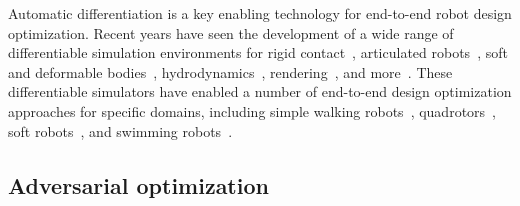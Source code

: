 Automatic differentiation is a key enabling technology for end-to-end robot design optimization. Recent years have seen the development of a wide range of differentiable simulation environments for rigid contact~\cite{heiden2021neuralsim,belubute_peres_lcp_physics,qiaoDifferentiableSimulationSoft2021,howelllecleach2022}, articulated robots~\cite{qiaoEfficientDifferentiableSimulation2021}, soft and deformable bodies~\cite{huChainQueenRealTimeDifferentiable2019,chenDaxBenchBenchmarkingDeformable2023,qiaoDifferentiableSimulationSoft2021}, hydrodynamics~\cite{ma2021diffaqua,leeAquariumFullyDifferentiable2023}, rendering~\cite{zhaoPhysicsbasedDifferentiableRendering2020,Jakob2020DrJit,lelidecDifferentiableRenderingPerturbed2021}, and more~\cite{huDiffTaichiDifferentiableProgramming2019, kidgerNeuralDifferentialEquations2022, murthyGradSimDifferentiableSimulation2021}.
%
These differentiable simulators have enabled a number of end-to-end design optimization approaches for specific domains, including simple walking robots~\cite{Schulz_robogami}, quadrotors~\cite{du2016computational}, soft robots~\cite{soft_robot_optimization_review,matthewsEfficientAutomaticDesign2023}, and swimming robots~\cite{du2021underwater,ma2021diffaqua}.

\subsection{Adversarial optimization}

